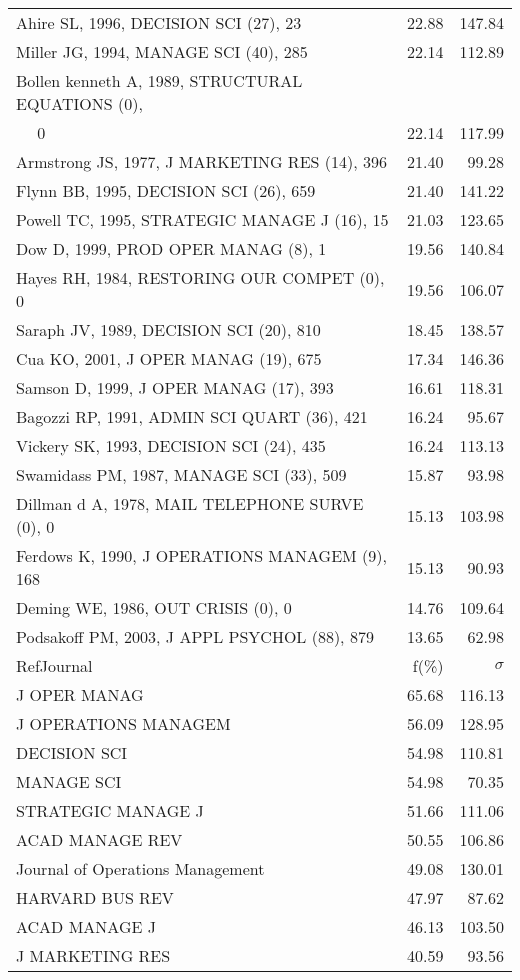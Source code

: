 \documentclass[a4paper,11pt]{report}
\begin{document}
\begin{landscape}
\begin{table}[!ht]
{\begin{tabular}{|l r r|}
Ahire SL, 1996, DECISION SCI (27), 23 & 22.88 & 147.84\\
Miller JG, 1994, MANAGE SCI (40), 285 & 22.14 & 112.89\\
Bollen kenneth A, 1989, STRUCTURAL EQUATIONS (0), &  & \\
$\quad$ 0 & 22.14 & 117.99\\
Armstrong JS, 1977, J MARKETING RES (14), 396 & 21.40 & 99.28\\
Flynn BB, 1995, DECISION SCI (26), 659 & 21.40 & 141.22\\
Powell TC, 1995, STRATEGIC MANAGE J (16), 15 & 21.03 & 123.65\\
Dow D, 1999, PROD OPER MANAG (8), 1 & 19.56 & 140.84\\
Hayes RH, 1984, RESTORING OUR COMPET (0), 0 & 19.56 & 106.07\\
Saraph JV, 1989, DECISION SCI (20), 810 & 18.45 & 138.57\\
Cua KO, 2001, J OPER MANAG (19), 675 & 17.34 & 146.36\\
Samson D, 1999, J OPER MANAG (17), 393 & 16.61 & 118.31\\
Bagozzi RP, 1991, ADMIN SCI QUART (36), 421 & 16.24 & 95.67\\
Vickery SK, 1993, DECISION SCI (24), 435 & 16.24 & 113.13\\
Swamidass PM, 1987, MANAGE SCI (33), 509 & 15.87 & 93.98\\
Dillman d A, 1978, MAIL TELEPHONE SURVE (0), 0 & 15.13 & 103.98\\
Ferdows K, 1990, J OPERATIONS MANAGEM (9), 168 & 15.13 & 90.93\\
Deming WE, 1986, OUT CRISIS (0), 0 & 14.76 & 109.64\\
Podsakoff PM, 2003, J APPL PSYCHOL (88), 879 & 13.65 & 62.98\\
\hline
\hline
RefJournal & f(\%) & $\sigma$\\
\hline
J OPER MANAG & 65.68 & 116.13\\
J OPERATIONS MANAGEM & 56.09 & 128.95\\
DECISION SCI & 54.98 & 110.81\\
MANAGE SCI & 54.98 & 70.35\\
STRATEGIC MANAGE J & 51.66 & 111.06\\
ACAD MANAGE REV & 50.55 & 106.86\\
Journal of Operations Management & 49.08 & 130.01\\
HARVARD BUS REV & 47.97 & 87.62\\
ACAD MANAGE J & 46.13 & 103.50\\
J MARKETING RES & 40.59 & 93.56\\
\hline
\end{tabular}
}
\end{table}


\end{landscape}
\end{document}
